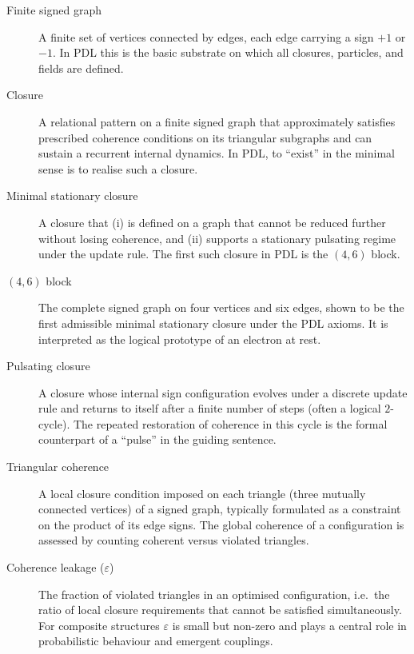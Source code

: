 \documentclass[11pt,a4paper]{article}
\theoremstyle{definition}
\begin{document}
\begin{description}

\item[Finite signed graph]
A finite set of vertices connected by edges, each edge carrying a sign $+1$ or $-1$. In PDL this is the basic substrate on which all closures, particles, and fields are defined.\cite{Laubscher_IntroPDL_2024,Laubscher_EmergencePhysicalReality_2024}

\item[Closure]
A relational pattern on a finite signed graph that approximately satisfies prescribed coherence conditions on its triangular subgraphs and can sustain a recurrent internal dynamics. In PDL, to ``exist'' in the minimal sense is to realise such a closure.\cite{Laubscher_EmergencePhysicalReality_2024,Laubscher_MinimalClosures_46_2024}

\item[Minimal stationary closure]
A closure that (i) is defined on a graph that cannot be reduced further without losing coherence, and (ii) supports a stationary pulsating regime under the update rule. The first such closure in PDL is the $(4,6)$ block.\cite{Laubscher_MinimalClosures_46_2024}

\item[$(4,6)$ block]
The complete signed graph on four vertices and six edges, shown to be the first admissible minimal stationary closure under the PDL axioms. It is interpreted as the logical prototype of an electron at rest.\cite{Laubscher_MinimalClosures_46_2024,Laubscher_EmergencePhysicalReality_2024}

\item[Pulsating closure]
A closure whose internal sign configuration evolves under a discrete update rule and returns to itself after a finite number of steps (often a logical $2$-cycle). The repeated restoration of coherence in this cycle is the formal counterpart of a ``pulse'' in the guiding sentence.\cite{Laubscher_IntroPDL_2024,Laubscher_Existence_PulsatingClosure_2026}

\item[Triangular coherence]
A local closure condition imposed on each triangle (three mutually connected vertices) of a signed graph, typically formulated as a constraint on the product of its edge signs. The global coherence of a configuration is assessed by counting coherent versus violated triangles.\cite{Laubscher_EmergencePhysicalReality_2024,Laubscher_Leakage_Probability_2024}

\item[Coherence leakage ($\varepsilon$)]
The fraction of violated triangles in an optimised configuration, i.e.\ the ratio of local closure requirements that cannot be satisfied simultaneously. For composite structures $\varepsilon$ is small but non-zero and plays a central role in probabilistic behaviour and emergent couplings.\cite{Laubscher_Leakage_Probability_2024,Laubscher_Exponent18_v2_2024}


\end{description}
\end{document}
